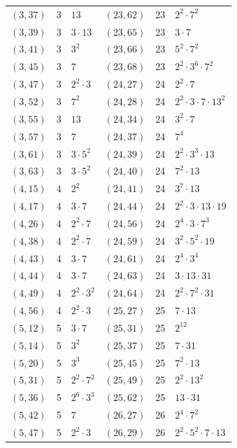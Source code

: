 \documentclass[11pt]{article}
\begin{document}
\begin{longtable}{@{}lrl@{\qquad}lrl@{}}
$(3,37)$ & 3 & $13$ & $(23,62)$ & 23 & $2^{2}\cdot 7^{2}$\\
$(3,39)$ & 3 & $3\cdot 13$ & $(23,65)$ & 23 & $3\cdot 7$\\
$(3,41)$ & 3 & $3^{2}$ & $(23,66)$ & 23 & $5^{2}\cdot 7^{2}$\\
$(3,45)$ & 3 & $7$ & $(23,68)$ & 23 & $2^{2}\cdot 3^{6}\cdot 7^{2}$\\
$(3,47)$ & 3 & $2^{2}\cdot 3$ & $(24,27)$ & 24 & $2^{2}\cdot 7$\\
$(3,52)$ & 3 & $7^{2}$ & $(24,28)$ & 24 & $2^{2}\cdot 3\cdot 7\cdot 13^{2}$\\
$(3,55)$ & 3 & $13$ & $(24,34)$ & 24 & $3^{2}\cdot 7$\\
$(3,57)$ & 3 & $7$ & $(24,37)$ & 24 & $7^{4}$\\
$(3,61)$ & 3 & $3\cdot 5^{2}$ & $(24,39)$ & 24 & $2^{2}\cdot 3^{3}\cdot 13$\\
$(3,63)$ & 3 & $3\cdot 5^{2}$ & $(24,40)$ & 24 & $7^{2}\cdot 13$\\
$(4,15)$ & 4 & $2^{2}$ & $(24,41)$ & 24 & $3^{7}\cdot 13$\\
$(4,17)$ & 4 & $3\cdot 7$ & $(24,44)$ & 24 & $2^{2}\cdot 3\cdot 13\cdot 19$\\
$(4,26)$ & 4 & $2^{2}\cdot 7$ & $(24,56)$ & 24 & $2^{4}\cdot 3\cdot 7^{3}$\\
$(4,38)$ & 4 & $2^{2}\cdot 7$ & $(24,59)$ & 24 & $3^{2}\cdot 5^{2}\cdot 19$\\
$(4,43)$ & 4 & $3\cdot 7$ & $(24,61)$ & 24 & $2^{4}\cdot 3^{4}$\\
$(4,44)$ & 4 & $3\cdot 7$ & $(24,63)$ & 24 & $3\cdot 13\cdot 31$\\
$(4,49)$ & 4 & $2^{2}\cdot 3^{2}$ & $(24,64)$ & 24 & $2^{2}\cdot 7^{2}\cdot 31$\\
$(4,56)$ & 4 & $2^{2}\cdot 3$ & $(25,27)$ & 25 & $7\cdot 13$\\
$(5,12)$ & 5 & $3\cdot 7$ & $(25,31)$ & 25 & $2^{12}$\\
$(5,14)$ & 5 & $3^{2}$ & $(25,37)$ & 25 & $7\cdot 31$\\
$(5,20)$ & 5 & $3^{3}$ & $(25,45)$ & 25 & $7^{2}\cdot 13$\\
$(5,31)$ & 5 & $2^{2}\cdot 7^{2}$ & $(25,49)$ & 25 & $2^{2}\cdot 13^{2}$\\
$(5,36)$ & 5 & $2^{6}\cdot 3^{3}$ & $(25,62)$ & 25 & $13\cdot 31$\\
$(5,42)$ & 5 & $7$ & $(26,27)$ & 26 & $2^{4}\cdot 7^{2}$\\
$(5,47)$ & 5 & $2^{2}\cdot 3$ & $(26,29)$ & 26 & $2^{2}\cdot 5^{2}\cdot 7\cdot 13$\\

\end{longtable}
\end{document}
